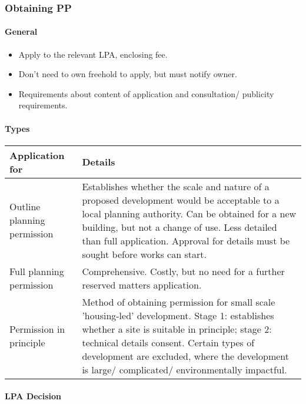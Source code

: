 \documentclass[
]{article}
\providecommand{\tightlist}{%
  \setlength{\itemsep}{0pt}\setlength{\parskip}{0pt}}
\begin{document}
\hypertarget{obtaining-pp}{%
\subsubsection{Obtaining PP}\label{obtaining-pp}}

\hypertarget{general}{%
\paragraph{General}\label{general}}

\begin{itemize}
\tightlist
\item
  Apply to the relevant LPA, enclosing fee.
\item
  Don't need to own freehold to apply, but must notify owner.
\item
  Requirements about content of application and consultation/ publicity
  requirements.
\end{itemize}

\hypertarget{types}{%
\paragraph{Types}\label{types}}

\begin{longtable}[]{@{}ll@{}}
\toprule()
Application for & Details \\
\midrule()
\endhead
Outline planning permission & Establishes whether the scale and nature
of a proposed development would be acceptable to a local planning
authority. Can be obtained for a new building, but not a change of use.
Less detailed than full application. Approval for details must be sought
before works can start. \\
Full planning permission & Comprehensive. Costly, but no need for a
further reserved matters application. \\
Permission in principle & Method of obtaining permission for small scale
'housing-led' development. Stage 1: establishes whether a site is
suitable in principle; stage 2: technical details consent. Certain types
of development are excluded, where the development is large/
complicated/ environmentally impactful. \\
\bottomrule()
\end{longtable}

\hypertarget{lpa-decision}{%
\paragraph{LPA Decision}\label{lpa-decision}}
\end{document}
